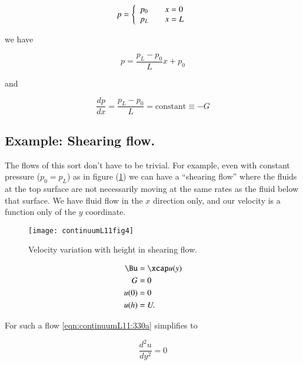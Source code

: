 \begin{equation}\label{eqn:continuumL11:430}
p =
\left\{
\begin{array}{l l}
p_0 & \quad \mbox{$x = 0$} \\
p_L & \quad \mbox{$x = L$} 
\end{array}
\right.
\end{equation}

we have

\begin{equation}\label{eqn:continuumL11:450}
p = \frac{p_L - p_0}{L} x + p_0
\end{equation}

and

\begin{equation}\label{eqn:continuumL11:470}
\frac{dp}{dx} = \frac{p_L - p_0}{L} = \text{constant} \equiv -G
\end{equation}

\subsection{Example: Shearing flow.}

The flows of this sort don't have to be trivial.  For example, even with constant pressure ($p_0 = p_L$) as in figure (\ref{fig:continuumL11:continuumL11fig4}) we can have a ``shearing flow'' where the fluids at the top surface are not necessarily moving at the same rates as the fluid below that surface.  We have fluid flow in the $x$ direction only, and our velocity is a function only of the $y$ coordinate.

\begin{figure}[htp]
   \centering
   \texttt{[image: continuumL11fig4]}
   \caption{Velocity variation with height in shearing flow.}\label{fig:continuumL11:continuumL11fig4}
\end{figure}

\begin{align}\label{eqn:continuumL11:490}
\Bu &= \xcap u(y) \\
G &= 0 \\
u(0) &= 0 \\
u(h) &= U.
\end{align}

For such a flow \ref{eqn:continuumL11:330a} simplifies to

\begin{equation}\label{eqn:continuumL11:530}
\frac{d^2 u}{dy^2} = 0
\end{equation}

